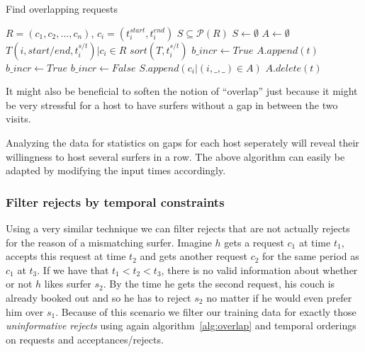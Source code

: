 \begin{algorithm}
\caption{Find overlapping requests}
\label{alg:overlap}
\begin{algorithmic} 
\REQUIRE $R = (c_1, c_2,\ldots,c_n)$, $c_i = (t_i^{start}, t_i^{end})$
\ENSURE $S\subseteq \mathcal{P}(R)$ 
\STATE $S \leftarrow \emptyset$
\STATE $A \leftarrow \emptyset$ 
\STATE $T {(i, start/end, t_i^{s/t}) |c_i \in R}$
\STATE $sort(T, t_i^{s/t})$ 
\STATE $b\_incr \leftarrow True$ 
\STATE $A.append(t)$
\STATE $b\_incr \leftarrow True$
\ELSE
{}
\STATE $b\_incr \leftarrow False$
\STATE $S.append({c_i | (i, \_, \_) \in A})$
\ENDIF
\STATE $A.delete(t)$
\ENDIF
\ENDFOR
\end{algorithmic}
\end{algorithm}

It might also be beneficial to soften the notion of ``overlap'' just because it might be very stressful for a host to have surfers without a gap in between the two visits.

Analyzing the data for statistics on gaps for each host seperately will reveal their willingness to host several surfers in a row.
The above algorithm can easily be adapted by modifying the input times accordingly.

\subsubsection{Filter rejects by temporal constraints}


Using a very similar technique we can filter rejects that are not actually rejects for the reason of a mismatching surfer. Imagine $h$ gets a request $c_1$ at time $t_1$, accepts this request at time $t_2$ and gets another request $c_2$ for the same period as $c_1$ at $t_3$. If we have that $t_1 < t_2 < t_3$, there is no valid information about whether or not $h$ likes surfer $s_2$. By the time he gets the second request, his couch is already booked out and so he has to reject $s_2$ no matter if he would even prefer him over $s_1$. Because of this scenario we filter our training data for exactly those \textit{uninformative rejects} using again algorithm~\ref{alg:overlap} and temporal orderings on requests and acceptances/rejects.


